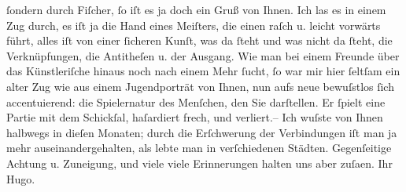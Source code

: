 \begin{ledgroupsized}[t]{13cm}
               ſondern durch Fiſcher, ſo iſt es ja doch ein Gruß
               von Ihnen. Ich las es in einem Zug durch, es iſt ja die Hand eines Meiſters, die
               einen raſch u. leicht vorwärts führt, alles iſt von einer ſicheren Kunſt, was da
               ſteht und was nicht da ſteht, die Verknüpfungen, die Antitheſen u. der Ausgang. Wie
               man bei einem Freunde über das Künstleriſche hinaus noch nach {\pb}einem Mehr ſucht, ſo war mir hier
               ſeltſam ein alter Zug wie aus einem Jugendporträt von Ihnen, nun aufs neue bewuſstlos
               ſich accentuierend: die Spielernatur des Menſchen, den Sie darſtellen. Er ſpielt eine
               Partie mit dem Schickſal, haſardiert frech, und verliert.\hspace*{1.5em}– Ich wuſste von Ihnen halbwegs in dieſen Monaten; durch die
               Erſchwerung der Verbindungen iſt man ja mehr auseinandergehalten, als lebte man in
               verſchiedenen Städten. Gegenſeitige Achtung u. Zuneigung, und viele viele
               Erinnerungen halten uns aber zuſa{\geminationm}en.\pend
           \pstart Ihr \spacefill\mbox{Hugo.}\pend{}
         
         \endnumbering{}\end{ledgroupsized}  \newcommand{\dateiname}{L02297}\newcommand{\titel}{Hugo von Hofmannsthal an Arthur Schnitzler, 17. 8. [1918]}\newcommand{\editorInnen}{Martin Anton Müller und Gerd-Hermann Susen}
      